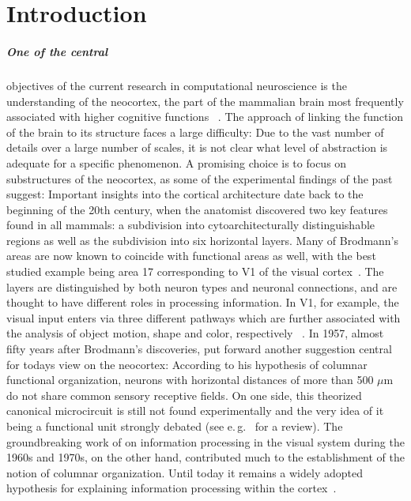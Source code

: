 \chapter{Introduction}
\label{sec:intro}

\paragraph{One of the central} objectives of the current research in computational neuroscience
is the understanding of the neocortex, the part of the mammalian brain 
most frequently associated with higher cognitive functions%
~\cite{bear2007neuroscience}.
The approach of linking the function of the brain to its structure faces a large 
difficulty: Due to the vast number of details over a large number of scales, 
it is not clear what level of abstraction is adequate for a specific phenomenon. 
A promising choice is to focus on substructures of the neocortex, as some of the experimental
findings of the past suggest: 
Important insights into the cortical architecture
date back to the beginning of the 20th century, when 
the anatomist  
discovered two key features found in all mammals:
a subdivision into cytoarchitecturally distinguishable regions 
as well as the subdivision into six horizontal 
layers. Many of Brodmann's areas are now known to coincide with functional areas 
as well, with the best studied example being area 17 corresponding to V1 of the
visual cortex~\cite{bear2007neuroscience}. The layers are 
distinguished by both neuron types and neuronal connections,  
and are thought to have different roles in processing information.
In V1, for example, the visual input enters via three different pathways which 
are further associated with the analysis of object motion, shape and color, respectively%
~\cite{bear2007neuroscience}.
In 1957, almost fifty years after Brodmann's discoveries, 
put forward another suggestion central for todays view on the neocortex:
According to his hypothesis of columnar functional organization, neurons with horizontal 
distances of more than 500 $\mu$m do not share common sensory receptive fields.
On one side, this theorized canonical microcircuit is still not found experimentally
and the very idea of it being a functional unit strongly debated (see e.\,g.~%
 for a review). The groundbreaking work of 
on information processing in the visual system during the 1960s and 1970s, on the other hand, 
contributed much to the establishment of the notion of columnar organization. 
Until today it remains a widely adopted hypothesis for explaining information processing 
within the cortex~\cite{defelipe2012neocortical}.   

